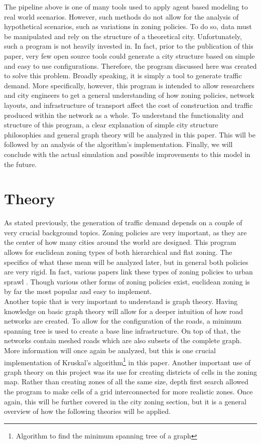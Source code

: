 \documentclass[11pt]{article}
\begin{document}
\begin{multicols}{2}
    \quad The pipeline above is one of many tools used to apply agent based modeling to real world scenarios. However, such methods do not allow for the analysis of hypothetical scenarios, such as variations in zoning policies. To do so, data must be manipulated and rely on the structure of a theoretical city. Unfortunately, such a program is not heavily invested in. In fact, prior to the publication of this paper, very few open source tools could generate a city structure based on simple and easy to use configurations. Therefore, the program discussed here was created to solve this problem. Broadly speaking, it is simply a tool to generate traffic demand. More specifically, however, this program is intended to allow researchers and city engineers to get a general understanding of how zoning policies, network layouts, and infrastructure of transport affect the cost of construction and traffic produced within the network as a whole. To understand the functionality and structure of this program, a clear explanation of simple city structure philosophies and general graph theory will be analyzed in this paper. This will be followed by an analysis of the algorithm's implementation. Finally, we will conclude with the actual simulation and possible improvements to this model in the future.

    \section{Theory}
    \quad As stated previously, the generation of traffic demand depends on a couple of very crucial background topics. Zoning policies are very important, as they are the center of how many cities around the world are designed. This program allows for euclidean zoning types of both hierarchical and flat zoning. The specifics of what these mean will be analyzed later, but in general both policies are very rigid. In fact, various papers link these types of zoning policies to urban sprawl \cite{zoning}. Though various other forms of zoning policies exist, euclidean zoning is by far the most popular and easy to implement.\\
    
    \quad Another topic that is very important to understand is graph theory. Having knowledge on basic graph theory will allow for a deeper intuition of how road networks are created. To allow for the configuration of the roads, a minimum spanning tree is used to create a base line infrastructure. On top of that, the networks contain meshed roads which are also subsets of the complete graph. More information will once again be analyzed, but this is one crucial implementation of Kruskal's algorithm\footnote{Algorithm to find the minimum spanning tree of a graph} in this paper. Another important use of graph theory on this project was its use for creating districts of cells in the zoning map. Rather than creating zones of all the same size, depth first search allowed the program to make cells of a grid interconnected for more realistic zones. Once again, this will be further covered in the city zoning section, but it is a general overview of how the following theories will be applied.


\end{multicols}
\end{document}
